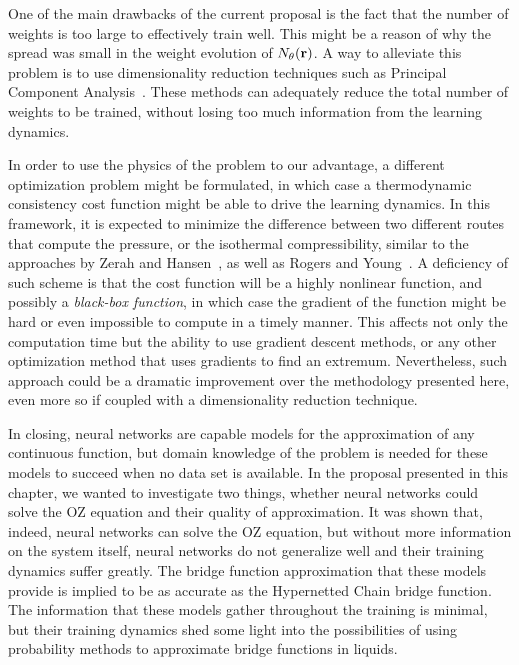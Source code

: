 One of the main drawbacks of the current proposal is the fact that the number of weights
is too large to effectively train well. This might be a reason of why the spread was
small in the weight evolution of $N_{\theta}(\mathbf{r})$. A way to alleviate this problem is to use
dimensionality reduction techniques such as
Principal Component Analysis~\cite{hastieElementsStatisticalLearning2009}. 
These methods can adequately reduce the total number of weights to be trained, without 
losing too much information from the learning dynamics.

In order to use the physics of the problem to our advantage, a different optimization
problem might be formulated, in which case a thermodynamic consistency cost function
might be able to drive the learning dynamics. In this framework, it is expected to minimize 
the difference between two different routes that compute the pressure, or the isothermal
compressibility, similar to the approaches by Zerah and Hansen~\cite{zerahSelfConsistentIntegral1986}, 
as well as Rogers and Young~\cite{rogersNewThermodynamicallyConsistent1984}.
A deficiency of such scheme is that the cost function will be
a highly nonlinear function, and possibly a \emph{black-box function}, in which case
the gradient of the function might be hard or even impossible to compute in a timely manner.
This affects not only the computation time but the ability to use gradient descent methods,
or any other optimization method that uses gradients to find an extremum.
Nevertheless, such approach could be a dramatic improvement over the methodology presented
here, even more so if coupled with a dimensionality reduction technique.

In closing, neural networks are capable models for the approximation of any continuous function, 
but domain knowledge of the problem is needed for these models to succeed when no data set 
is available. In the proposal presented in this chapter, we wanted to investigate two things, 
whether neural networks could solve the OZ equation and their quality of approximation. 
It was shown that, indeed, neural networks can solve the OZ equation, but without more 
information on the system itself, neural networks do not generalize well and their training 
dynamics suffer greatly. The bridge function approximation that these models provide is
implied to be as accurate as the Hypernetted Chain bridge function.
The information that these models gather throughout the training 
is minimal, but their training dynamics shed some light into the possibilities of using 
probability methods to approximate bridge functions in liquids.